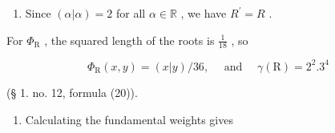 \begin{enumerate}
\def\labelenumi{(\Alph{enumi})}
\setcounter{enumi}{21}
\tightlist
\item
  Since \((\alpha |\alpha) = 2\) for all \(\alpha \in \mathbb{R}\) , we have \(R^{\prime} = R\) .
\end{enumerate}

For \(\Phi_{\mathrm{R}}\) , the squared length of the roots is \(\frac{1}{18}\) , so

\[
\Phi_ {\mathrm{R}} (x, y) = (x | y) / 36, \quad \text { and } \quad \gamma (\mathrm{R}) = 2 ^ {2}. 3 ^ {4}
\]

(§ 1. no. 12, formula (20)).

\begin{enumerate}
\def\labelenumi{(\Roman{enumi})}
\setcounter{enumi}{5}
\tightlist
\item
  Calculating the fundamental weights gives
\end{enumerate}

